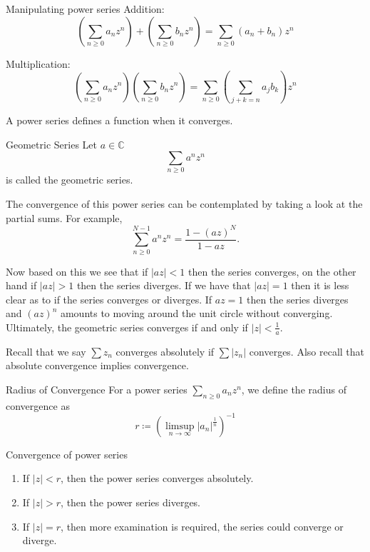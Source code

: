 \documentclass{article}
\begin{document}
\begin{rmk}{Manipulating power series}{}
Addition:
\[
    (\sum_{n\geq 0} a_{n} z^n )+(\sum_{n \geq 0} b_{n} z^n) = \sum_{n\geq 0} (a_{n} + b_{n} )z^n 
\]

Multiplication:
\[
    (\sum_{n\geq 0}a_{n} z^n )(\sum_{n\geq 0} b_{n} z^n ) = \sum_{n\geq 0}(\sum_{j + k = n}a_{j} b_{k}  )z^n 
\]
\end{rmk}

A power series defines a function when it converges. 

\begin{exmp}{Geometric Series}{}
Let \( a \in \mathbb{C}  \) 
\[
    \sum_{n\geq 0} a^n z^n
\]
is called the geometric series. 

The convergence of this power series can be contemplated by taking a look at the partial sums. For example,
\[
    \sum_{n\geq 0}^{N - 1} a^n z^n = \frac{1 -(az)^N}{1 - az} .
\]

Now based on this we see that if \( |az| < 1 \) then the series converges, on the other hand if \(|az| > 1 \) then the series diverges. If we have that \( |az| = 1 \) then it is less clear as to if the series converges or diverges. If \( az = 1 \) then the series diverges and \( (az)^n \) amounts to moving around the unit circle without converging. Ultimately, the geometric series converges if and only if \( |z| < \frac{1}{a} \).
\end{exmp}

Recall that we say \( \sum z_{n}   \) converges absolutely if \( \sum |z_{n} | \) converges. Also recall that absolute convergence implies convergence. 

\begin{defn}{Radius of Convergence}{}
For a power series \( \sum_{n\geq 0}  a_{n} z^n\), we define the radius of convergence as 
\[
    r\coloneqq (\limsup_{n \to \infty} |a_{n} |^\frac{1}{n})^{-1} 
\]
\end{defn}

\begin{thrm}{Convergence of power series}{}
\begin{enumerate}[]
    \item If \( |z| < r \), then the power series converges absolutely.
    \item If \( |z| >r \), then the power series diverges. 
    \item If \( |z| = r \), then more examination is required, the series could converge or diverge. 
\end{enumerate}
\end{thrm}
\end{document}
